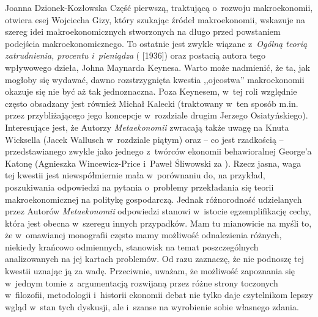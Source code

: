 \begin{recplenv}{Joanna Dzionek-Kozłowska}
Część pierwszą, traktującą o~rozwoju makroekonomii, otwiera esej Wojciecha Gizy, który szukając źródeł makroekonomii,
wskazuje na szereg idei makroekonomicznych stworzonych na długo przed powstaniem podejścia makroekonomicznego.
To ostatnie jest zwykle wiązane z~\textit{Ogólną teorią zatrudnienia, procentu i~pieniądza}
(\cite{keynes_ogolna_2003} [1936])
oraz postacią autora tego wpływowego dzieła, Johna
Maynarda Keynesa. Warto może nadmienić, że ta, jak mogłoby się wydawać, dawno rozstrzygnięta kwestia ,,ojcostwa''
makroekonomii okazuje się nie być aż tak jednoznaczna. Poza Keynesem, w~tej roli względnie często obsadzany jest również
Michał Kalecki (traktowany w~ten sposób m.in. przez przybliżającego jego koncepcje w~rozdziale drugim Jerzego
Osiatyńskiego). Interesujące jest, że Autorzy \textit{Metaekonomii} zwracają także uwagę na Knuta Wicksella (Jacek
Wallusch w~rozdziale piątym) oraz -- co jest rzadkością -- przedstawianego zwykle jako jednego z~twórców ekonomii
behawioralnej George'a Katonę (Agnieszka Wincewicz-Price i~Paweł Śliwowski za
\parencite{colander_complexity_2014}).
Rzecz jasna, waga tej kwestii jest niewspółmiernie mała w~porównaniu do, na przykład, poszukiwania
odpowiedzi na pytania o~problemy przekładania się teorii makroekonomicznej na politykę gospodarczą. Jednak różnorodność 
udzielanych przez Autorów \textit{Metaekonomii} odpowiedzi stanowi w~istocie egzemplifikację cechy,
która jest obecna w~szeregu innych przypadków. Mam tu mianowicie na myśli to, że w~omawianej monografii często mamy
możliwość odnalezienia różnych, niekiedy krańcowo odmiennych, stanowisk na temat poszczególnych analizowanych na jej
kartach problemów. Od razu zaznaczę, że nie podnoszę tej kwestii uznając ją za wadę. Przeciwnie, uważam, że możliwość
zapoznania się w~jednym tomie z~argumentacją rozwijaną przez różne strony toczonych w~filozofii, metodologii i~historii
ekonomii debat nie tylko daje czytelnikom lepszy wgląd w~stan tych dyskusji, ale i~szanse na wyrobienie sobie własnego
zdania.


\end{recplenv}

